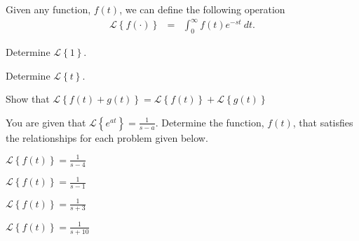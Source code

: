   \begin{problem}

    

  \item Given any function, $f(t)$, we can define the following
    operation 
    \begin{eqnarray*}
      \mathcal{L}\left\{ f(\cdot) \right\} & = & 
      \int^\infty_0 f(t) e^{-st} ~ dt.
    \end{eqnarray*}

    \begin{subproblem}
      \item Determine $\mathcal{L}\left\{ 1 \right\}$.
        \vfill

      \item Determine $\mathcal{L}\left\{ t \right\}$.
        \vfill

    \item Show that $\mathcal{L}\left\{ f(t) + g(t) \right\} =
      \mathcal{L}\left\{ f(t) \right\} + \mathcal{L}\left\{ g(t) \right\}$

        \vspace{3em}

    \end{subproblem}

    \clearpage

  \item You are given that $\mathcal{L}\left\{ e^{at} \right\} =
    \frac{1}{s-a}$. Determine the function, $f(t)$, that satisfies the
    relationships for each problem given below.
    
    \begin{subproblem}
      


      \item $\mathcal{L}\left\{ f(t) \right\}=\frac{1}{s-4}$

        \vfill

      \item $\mathcal{L}\left\{ f(t) \right\}=\frac{1}{s-1}$

        \vfill

      \item $\mathcal{L}\left\{ f(t) \right\}=\frac{1}{s+3}$

        \vfill

      \item $\mathcal{L}\left\{ f(t) \right\}=\frac{1}{s+10}$

        \vfill


    \end{subproblem}


\end{problem}

